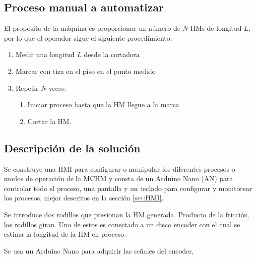 \documentclass[main_conf.tex]{subfiles}
\begin{document}
\subsection{Proceso manual a automatizar}
\label{sec:intro:proceso_manual}
El propósito de la máquina es proporcionar un número de $N$ HMs
de longitud $L$, por lo que el operador sigue el siguiente
procedimiento:

\begin{enumerate}
\label{enum:intro:descripcion_maquina}
\item Medir una longitud $L$ desde la cortadora
\item Marcar con tiza en el piso en el punto medido
\item Repetir $N$ veces:
  \begin{enumerate}
    \item Iniciar proceso hasta que la HM llegue a la marca
    \item Cortar la HM.
  \end{enumerate}    
\end{enumerate}

\subsection{Descripción de la solución}
Se construye una HMI para configurar o manipular los  diferentes
procesos o modos de operación de la MCHM y consta de un Arduino
Nano (AN) para controlar todo el proceso, una pantalla
y un teclado para configurar y monitorear los procesos,
mejor descritos en la sección \ref{sec:HMI}.

Se introduce dos rodillos que presionan la HM generada.
Producto de la fricción, los rodillos giran. Uno de estos es conectado a
un disco encoder con el cual se estima la longitud de la HM en proceso.

Se usa un Arduino Nano para adquirir las señales del encoder,
\end{document}
